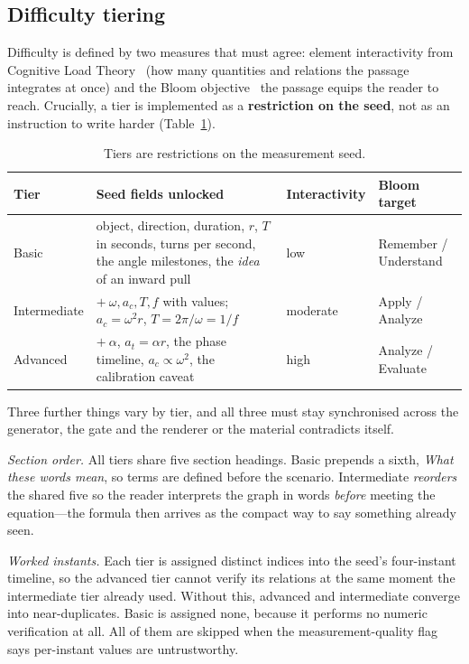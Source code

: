 \documentclass[conference]{IEEEtran}
\newcommand{\ac}{a_{c}}
\newcommand{\at}{a_{t}}
\begin{document}
\subsection{Difficulty tiering}
\label{sec:tiers}

Difficulty is defined by two measures that must agree: element interactivity
from Cognitive Load Theory~\cite{sweller} (how many quantities and relations
the passage integrates at once) and the Bloom objective~\cite{bloom} the
passage equips the reader to reach. Crucially, a tier is implemented as a
\textbf{restriction on the seed}, not as an instruction to write harder
(Table~\ref{tab:tiers}).

\begin{table}[t]
\caption{Tiers are restrictions on the measurement seed.}
\label{tab:tiers}
\centering
\footnotesize
\begin{tabular}{@{}p{}p{}p{}p{}@{}}
\toprule
\textbf{Tier} & \textbf{Seed fields unlocked} & \textbf{Interactivity} & \textbf{Bloom target} \\
\midrule
Basic & object, direction, duration, $r$, $T$ in seconds, turns per second, the angle milestones, the \emph{idea} of an inward pull & low & Remember / Understand \\
\addlinespace[2pt]
Inter\-mediate & $+\ \omega, \ac, T, f$ with values; $\ac = \omega^{2}r$, $T = 2\pi/\omega = 1/f$ & moderate & Apply / Analyze \\
\addlinespace[2pt]
Advanced & $+\ \alpha$, $\at = \alpha r$, the phase timeline, $\ac \propto \omega^{2}$, the calibration caveat & high & Analyze / Evaluate \\
\bottomrule
\end{tabular}
\end{table}

Three further things vary by tier, and all three must stay synchronised across
the generator, the gate and the renderer or the material contradicts itself.

\emph{Section order.} All tiers share five section headings. Basic prepends a
sixth, \emph{What these words mean}, so terms are defined before the scenario.
Intermediate \emph{reorders} the shared five so the reader interprets the graph
in words \emph{before} meeting the equation---the formula then arrives as the
compact way to say something already seen.

\emph{Worked instants.} Each tier is assigned distinct indices into the seed's
four-instant timeline, so the advanced tier cannot verify its relations at the
same moment the intermediate tier already used. Without this, advanced and
intermediate converge into near-duplicates. Basic is assigned none, because it
performs no numeric verification at all. All of them are skipped when the
measurement-quality flag says per-instant values are untrustworthy.
\end{document}
